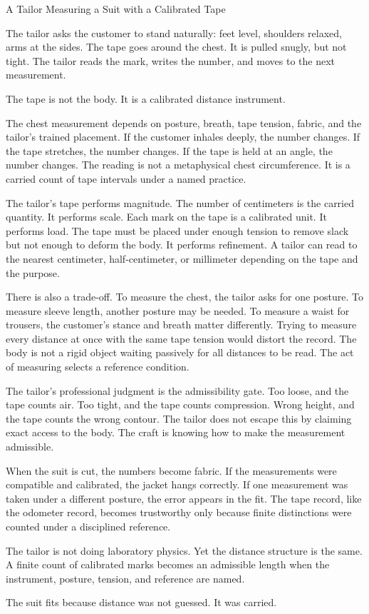 \begin{coda}{A Tailor Measuring a Suit with a Calibrated Tape}

The tailor asks the customer to stand naturally: feet level, shoulders relaxed,
arms at the sides. The tape goes around the chest. It is pulled snugly, but not
tight. The tailor reads the mark, writes the number, and moves to the next
measurement.

The tape is not the body. It is a calibrated distance instrument.

The chest measurement depends on posture, breath, tape tension, fabric, and the
tailor's trained placement. If the customer inhales deeply, the number changes.
If the tape stretches, the number changes. If the tape is held at an angle, the
number changes. The reading is not a metaphysical chest circumference. It is a
carried count of tape intervals under a named practice.

The tailor's tape performs magnitude. The number of centimeters is the carried
quantity. It performs scale. Each mark on the tape is a calibrated unit. It
performs load. The tape must be placed under enough tension to remove slack but
not enough to deform the body. It performs refinement. A tailor can read to the
nearest centimeter, half-centimeter, or millimeter depending on the tape and the
purpose.

There is also a trade-off. To measure the chest, the tailor asks for one
posture. To measure sleeve length, another posture may be needed. To measure a
waist for trousers, the customer's stance and breath matter differently. Trying
to measure every distance at once with the same tape tension would distort the
record. The body is not a rigid object waiting passively for all distances to be
read. The act of measuring selects a reference condition.

The tailor's professional judgment is the admissibility gate. Too loose, and
the tape counts air. Too tight, and the tape counts compression. Wrong height,
and the tape counts the wrong contour. The tailor does not escape this by
claiming exact access to the body. The craft is knowing how to make the
measurement admissible.

When the suit is cut, the numbers become fabric. If the measurements were
compatible and calibrated, the jacket hangs correctly. If one measurement was
taken under a different posture, the error appears in the fit. The tape record,
like the odometer record, becomes trustworthy only because finite distinctions
were counted under a disciplined reference.

The tailor is not doing laboratory physics. Yet the distance structure is the
same. A finite count of calibrated marks becomes an admissible length when the
instrument, posture, tension, and reference are named.

The suit fits because distance was not guessed. It was carried.

\end{coda}
